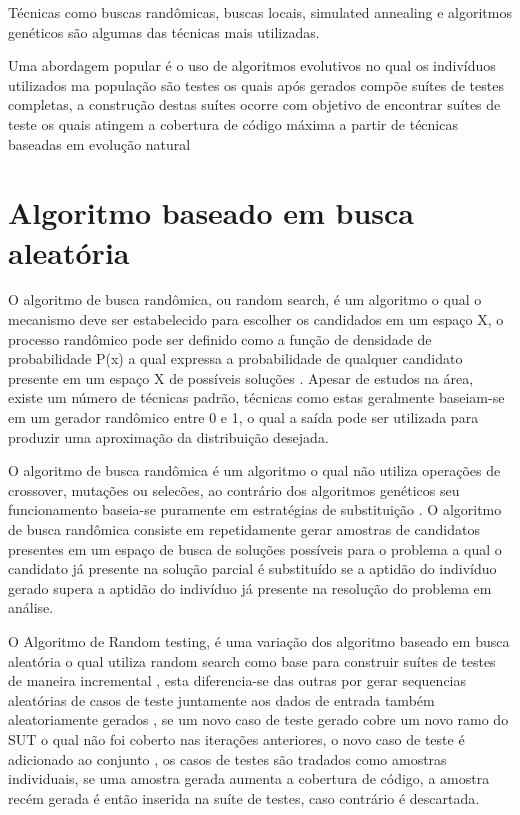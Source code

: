 \documentclass[
	12pt,				%
	oneside,			%
	a4paper,			%
	english,			%
	brazil				%
	]{abntex2ppgsi}
\begin{document}
Técnicas como buscas randômicas, buscas locais, simulated annealing e algoritmos genéticos são algumas das técnicas mais utilizadas. \cite{rojas2017b}

Uma abordagem popular é o uso de algoritmos evolutivos no qual os indivíduos utilizados ma população são testes os quais  após gerados compõe suítes de testes completas, a construção destas suítes ocorre com objetivo de encontrar suítes de teste os quais atingem a cobertura de código máxima a partir de técnicas baseadas em evolução natural \cite{Campos2017}

\section{Algoritmo baseado em busca aleatória}

O algoritmo de busca randômica, ou random search,  é um algoritmo o qual o mecanismo deve ser estabelecido para escolher os candidados em um espaço X, o processo randômico pode ser definido como a função de densidade de probabilidade P(x) a qual expressa a probabilidade de qualquer candidato presente em um espaço X de possíveis soluções \cite{Karnopp63}. Apesar de estudos na área, existe um número de técnicas padrão, técnicas como estas geralmente baseiam-se em um gerador randômico entre 0 e 1, o qual a saída pode ser utilizada para produzir uma aproximação da distribuição desejada. \cite{Karnopp63}

O algoritmo de busca randômica é um algoritmo o qual não utiliza operações de crossover, mutações ou selecões, ao contrário dos algoritmos genéticos seu funcionamento baseia-se puramente em estratégias de substituição \cite{Campos2017}. O algoritmo de busca randômica consiste em repetidamente gerar amostras de candidatos presentes em um espaço de busca de soluções possíveis para o problema a qual o candidato já presente na solução parcial é substituído se a aptidão do indivíduo gerado supera a aptidão do indivíduo já presente na resolução do problema em análise. \cite{Campos2017}

O Algoritmo de Random testing, é uma variação dos algoritmo baseado em busca aleatória o qual utiliza random search como base para construir suítes de testes de maneira incremental \cite{Campos2017} , esta diferencia-se das outras por gerar sequencias aleatórias de casos de teste juntamente aos dados de entrada também  aleatoriamente gerados \cite{shamriski20151115}, se um novo caso de teste gerado cobre um novo ramo do SUT o qual não foi coberto nas iterações anteriores, o novo caso de teste é adicionado ao conjunto  \cite{shamriski20151115}, os casos de testes são tradados como amostras individuais, se uma amostra gerada aumenta a cobertura de código, a amostra recém gerada é então inserida na suíte de testes, caso contrário é descartada. \cite{Campos2017}
\end{document}
